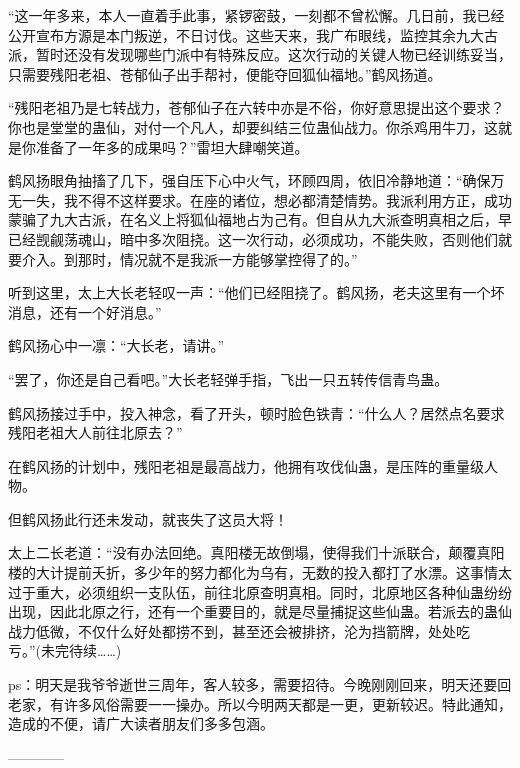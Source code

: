 \begin{this_body}
“这一年多来，本人一直着手此事，紧锣密鼓，一刻都不曾松懈。几日前，我已经公开宣布方源是本门叛逆，不日讨伐。这些天来，我广布眼线，监控其余九大古派，暂时还没有发现哪些门派中有特殊反应。这次行动的关键人物已经训练妥当，只需要残阳老祖、苍郁仙子出手帮衬，便能夺回狐仙福地。”鹤风扬道。

“残阳老祖乃是七转战力，苍郁仙子在六转中亦是不俗，你好意思提出这个要求？你也是堂堂的蛊仙，对付一个凡人，却要纠结三位蛊仙战力。你杀鸡用牛刀，这就是你准备了一年多的成果吗？”雷坦大肆嘲笑道。

鹤风扬眼角抽搐了几下，强自压下心中火气，环顾四周，依旧冷静地道：“确保万无一失，我不得不这样要求。在座的诸位，想必都清楚情势。我派利用方正，成功蒙骗了九大古派，在名义上将狐仙福地占为己有。但自从九大派查明真相之后，早已经觊觎荡魂山，暗中多次阻挠。这一次行动，必须成功，不能失败，否则他们就要介入。到那时，情况就不是我派一方能够掌控得了的。”

听到这里，太上大长老轻叹一声：“他们已经阻挠了。鹤风扬，老夫这里有一个坏消息，还有一个好消息。”

鹤风扬心中一凛：“大长老，请讲。”

“罢了，你还是自己看吧。”大长老轻弹手指，飞出一只五转传信青鸟蛊。

鹤风扬接过手中，投入神念，看了开头，顿时脸色铁青：“什么人？居然点名要求残阳老祖大人前往北原去？”

在鹤风扬的计划中，残阳老祖是最高战力，他拥有攻伐仙蛊，是压阵的重量级人物。

但鹤风扬此行还未发动，就丧失了这员大将！

太上二长老道：“没有办法回绝。真阳楼无故倒塌，使得我们十派联合，颠覆真阳楼的大计提前夭折，多少年的努力都化为乌有，无数的投入都打了水漂。这事情太过于重大，必须组织一支队伍，前往北原查明真相。同时，北原地区各种仙蛊纷纷出现，因此北原之行，还有一个重要目的，就是尽量捕捉这些仙蛊。若派去的蛊仙战力低微，不仅什么好处都捞不到，甚至还会被排挤，沦为挡箭牌，处处吃亏。”(未完待续……)

ps：明天是我爷爷逝世三周年，客人较多，需要招待。今晚刚刚回来，明天还要回老家，有许多风俗需要一一操办。所以今明两天都是一更，更新较迟。特此通知，造成的不便，请广大读者朋友们多多包涵。

------------

\end{this_body}

